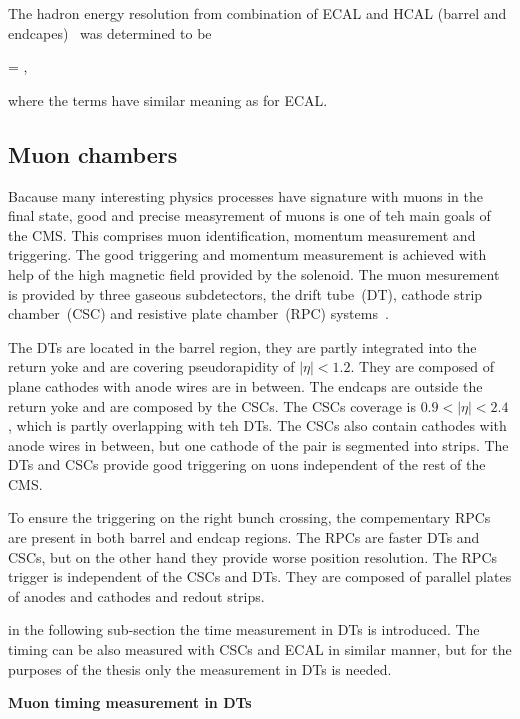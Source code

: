 The hadron energy resolution from combination of ECAL and HCAL (barrel and endcapes)~\cite{Chatrchyan:2009ag} was determined to be


{
  =   ,
}

where the terms have similar meaning as for ECAL.

\subsection{Muon chambers}

Bacause many interesting physics processes have signature with muons in the final state, good and precise measyrement of muons is one of teh main goals of the CMS. This comprises muon identification, momentum measurement and triggering. The good triggering and momentum measurement is achieved with help of the high magnetic field provided by the solenoid. The muon mesurement is provided by three gaseous subdetectors, the drift tube~(DT), cathode strip chamber~(CSC) and resistive plate chamber~(RPC) systems~\cite{tdrMuon}.

The DTs are located in the barrel region, they are partly integrated into the return yoke and are covering pseudorapidity of $|\eta|<1.2$. They are composed of plane cathodes with anode wires are in between. The endcaps are outside the return yoke and are composed by the CSCs. The CSCs coverage is $0.9<|\eta|<2.4$, which is partly overlapping with teh DTs. The CSCs also contain cathodes with anode wires in between, but one cathode of the pair is segmented into strips. The DTs and CSCs provide good triggering on uons independent of the rest of the CMS.

To ensure the triggering on the right bunch crossing, the compementary RPCs are present in both barrel and endcap regions. The RPCs are faster DTs and CSCs, but on the other hand they provide worse position resolution. The RPCs trigger is independent of the CSCs and DTs. They are composed of parallel plates of anodes and cathodes and redout strips. 

in the following sub-section the time measurement in DTs is introduced. The timing can be also measured with CSCs and ECAL in similar manner, but for the purposes of the thesis only the measurement in DTs is needed.

\textbf{Muon timing measurement in DTs}

